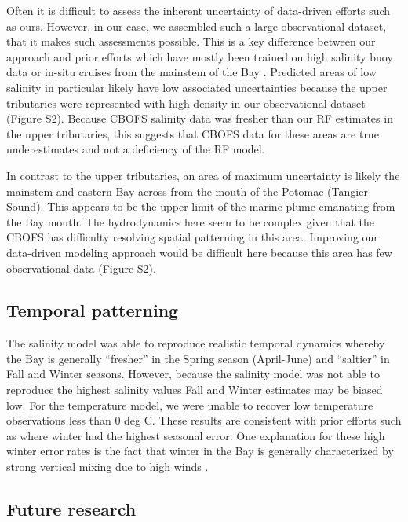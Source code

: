\documentclass{article}
\begin{document}
Often it is difficult to assess the inherent uncertainty of data-driven efforts such as ours. However, in our case, we assembled such a large observational dataset, that it makes such assessments possible. This is a key difference between our approach and prior efforts which have mostly been trained on high salinity buoy data or in-situ cruises from the mainstem of the Bay \citep{vogelAssessingSatelliteSea2016, geigerSatellitederivedCoastalOcean2013, ondrusekDevelopmentNewOptical2012}. Predicted areas of low salinity in particular likely have low associated uncertainties because the upper tributaries were represented with high density in our observational dataset (Figure S2). Because CBOFS salinity data was fresher than our RF estimates in the upper tributaries, this suggests that CBOFS data for these areas are true underestimates and not a deficiency of the RF model.

In contrast to the upper tributaries, an area of maximum uncertainty is likely the mainstem and eastern Bay across from the mouth of the Potomac (Tangier Sound). This appears to be the upper limit of the marine plume emanating from the Bay mouth. The hydrodynamics here seem to be complex given that the CBOFS has difficulty resolving spatial patterning in this area. Improving our data-driven modeling approach would be difficult here because this area has few observational data (Figure S2).

\subsection{Temporal patterning}

The salinity model was able to reproduce realistic temporal dynamics whereby the Bay is generally “fresher” in the Spring season (April-June) and “saltier” in Fall and Winter seasons. However, because the salinity model was not able to reproduce the highest salinity values Fall and Winter estimates may be biased low. For the temperature model, we were unable to recover low temperature observations less than 0 deg C. These results are consistent with prior efforts such as \citet{geigerSatellitederivedCoastalOcean2013} where winter had the highest seasonal error. One explanation for these high winter error rates is the fact that winter in the Bay is generally characterized by strong vertical mixing due to high winds \citep{sonWaterPropertiesChesapeake2012, xuClimateForcingSalinity2012}.

\subsection{Future research}
\end{document}
